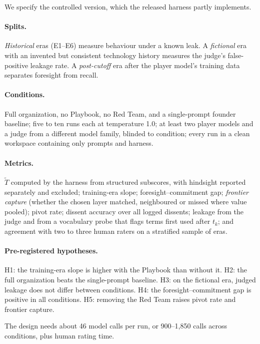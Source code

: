 \documentclass[11pt]{article}
\theoremstyle{definition}
\begin{document}
We specify the controlled version, which the released harness partly implements.

\paragraph{Splits.} \emph{Historical} eras (E1--E6) measure behaviour under a known leak. A \emph{fictional} era with an invented but consistent technology history measures the judge's false-positive leakage rate. A \emph{post-cutoff} era after the player model's training data \citep{cheng2024dated} separates foresight from recall.

\paragraph{Conditions.} Full organization, no Playbook, no Red Team, and a single-prompt founder baseline; five to ten runs each at temperature 1.0; at least two player models and a judge from a different model family, blinded to condition; every run in a clean workspace containing only prompts and harness.

\paragraph{Metrics.} $\tilde{T}$ computed by the harness from structured subscores, with hindsight reported separately and excluded; training-era slope; foresight--commitment gap; \emph{frontier capture} (whether the chosen layer matched, neighboured or missed where value pooled); pivot rate; dissent accuracy over all logged dissents; leakage from the judge and from a vocabulary probe that flags terms first used after $t_k$; and agreement with two to three human raters on a stratified sample of eras.

\paragraph{Pre-registered hypotheses.} H1: the training-era slope is higher with the Playbook than without it. H2: the full organization beats the single-prompt baseline. H3: on the fictional era, judged leakage does not differ between conditions. H4: the foresight--commitment gap is positive in all conditions. H5: removing the Red Team raises pivot rate and frontier capture.

The design needs about 46 model calls per run, or 900--1,850 calls across conditions, plus human rating time.
\end{document}
